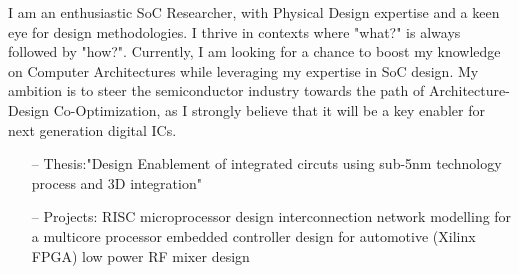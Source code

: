 \documentclass[10pt,a4paper]{altacv}
\begin{document}
\tagline{}

%

\begin{fullwidth}
\makecvheader
{}
\justify 
\small{I am an enthusiastic SoC Researcher, with Physical Design expertise and a keen eye for design methodologies. I thrive in contexts where "what?" is always followed by "how?". Currently, I am looking for a chance to boost my knowledge on Computer Architectures while leveraging my expertise in SoC design. My ambition is to steer the semiconductor industry towards the path of  Architecture-Design Co-Optimization, as I strongly believe that it will be a key enabler for next generation digital ICs.}
\end{fullwidth}

%




\begin{itemize}
    \setlength{\itemindent}{0.5em}
    \item[--] \small{Thesis:"Design Enablement of integrated circuts using sub-5nm technology process and 3D integration"}
\end{itemize}
\medskip


 \begin{itemize}
    \setlength{\itemindent}{0.5em}
    \item[--] \small{Projects: RISC microprocessor design \textbullet\hspace{0.1em} interconnection network modelling for a multicore processor \textbullet\hspace{0.1em} embedded controller design for automotive (Xilinx FPGA) \textbullet\hspace{0.1em} low power RF mixer design}
\end{itemize}
\end{document}
